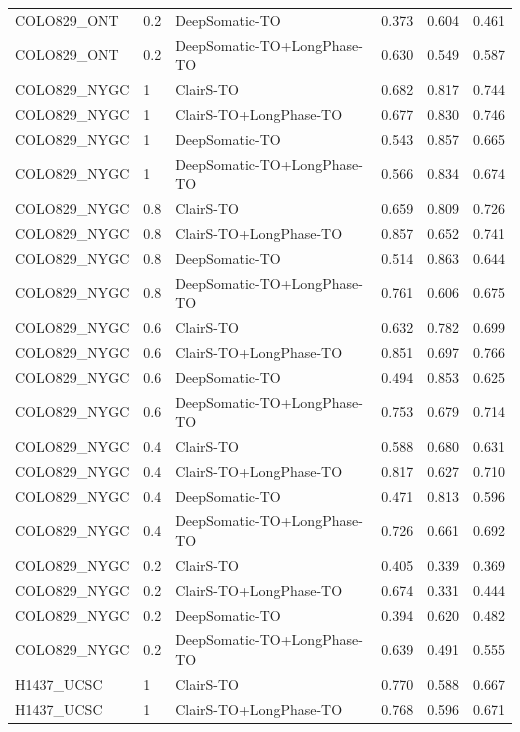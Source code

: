 \documentclass[pdflatex,sn-nature]{sn-jnl}
\begin{document}
{\begin{longtable}{@{}lllccc@{}}
  COLO829\_ONT & 0.2 & DeepSomatic-TO & 0.373 & 0.604 & 0.461 \\
  COLO829\_ONT & 0.2 & DeepSomatic-TO+LongPhase-TO & 0.630 & 0.549 & 0.587 \\
  COLO829\_NYGC & 1 & ClairS-TO & 0.682 & 0.817 & 0.744 \\
  COLO829\_NYGC & 1 & ClairS-TO+LongPhase-TO & 0.677 & 0.830 & 0.746 \\
  COLO829\_NYGC & 1 & DeepSomatic-TO & 0.543 & 0.857 & 0.665 \\
  COLO829\_NYGC & 1 & DeepSomatic-TO+LongPhase-TO & 0.566 & 0.834 & 0.674 \\
  COLO829\_NYGC & 0.8 & ClairS-TO & 0.659 & 0.809 & 0.726 \\
  COLO829\_NYGC & 0.8 & ClairS-TO+LongPhase-TO & 0.857 & 0.652 & 0.741 \\
  COLO829\_NYGC & 0.8 & DeepSomatic-TO & 0.514 & 0.863 & 0.644 \\
  COLO829\_NYGC & 0.8 & DeepSomatic-TO+LongPhase-TO & 0.761 & 0.606 & 0.675 \\
  COLO829\_NYGC & 0.6 & ClairS-TO & 0.632 & 0.782 & 0.699 \\
  COLO829\_NYGC & 0.6 & ClairS-TO+LongPhase-TO & 0.851 & 0.697 & 0.766 \\
  COLO829\_NYGC & 0.6 & DeepSomatic-TO & 0.494 & 0.853 & 0.625 \\
  COLO829\_NYGC & 0.6 & DeepSomatic-TO+LongPhase-TO & 0.753 & 0.679 & 0.714 \\
  COLO829\_NYGC & 0.4 & ClairS-TO & 0.588 & 0.680 & 0.631 \\
  COLO829\_NYGC & 0.4 & ClairS-TO+LongPhase-TO & 0.817 & 0.627 & 0.710 \\
  COLO829\_NYGC & 0.4 & DeepSomatic-TO & 0.471 & 0.813 & 0.596 \\
  COLO829\_NYGC & 0.4 & DeepSomatic-TO+LongPhase-TO & 0.726 & 0.661 & 0.692 \\
  COLO829\_NYGC & 0.2 & ClairS-TO & 0.405 & 0.339 & 0.369 \\
  COLO829\_NYGC & 0.2 & ClairS-TO+LongPhase-TO & 0.674 & 0.331 & 0.444 \\
  COLO829\_NYGC & 0.2 & DeepSomatic-TO & 0.394 & 0.620 & 0.482 \\
  COLO829\_NYGC & 0.2 & DeepSomatic-TO+LongPhase-TO & 0.639 & 0.491 & 0.555 \\
  H1437\_UCSC & 1 & ClairS-TO & 0.770 & 0.588 & 0.667 \\
  H1437\_UCSC & 1 & ClairS-TO+LongPhase-TO & 0.768 & 0.596 & 0.671 \\

\end{longtable}}
\end{document}
